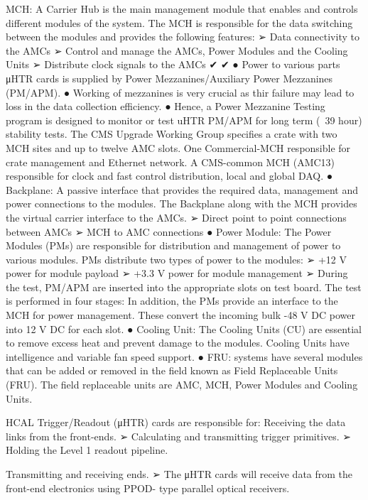 MCH:
A \mtca Carrier Hub is the main management module that enables and
controls different modules of the \mtca system. The MCH is responsible for the data
switching between the modules and provides the following features:
➢ Data connectivity to the AMCs
➢ Control and manage the AMCs, Power Modules and the Cooling Units
➢ Distribute clock signals to the AMCs
✔
✔
● Power
to various parts μHTR cards is supplied by Power
Mezzanines/Auxiliary Power Mezzanines (PM/APM).
● Working of mezzanines is very crucial as thir failure may lead to loss in
the data collection efficiency.
● Hence, a Power Mezzanine Testing program is designed to monitor or test
uHTR PM/APM for long term (~39 hour) stability tests.
The CMS Upgrade Working Group specifies a \mtca crate with two MCH sites and
up to twelve AMC slots.
One Commercial-MCH responsible for crate management and Ethernet
network.
A CMS-common MCH (AMC13) responsible for clock and fast control
distribution, local and global DAQ.
● Backplane:
A passive interface that provides the required data, management and
power connections to the \mtca modules. The Backplane along with the MCH
provides the virtual carrier interface to the AMCs.
➢ Direct point to point connections between AMCs
➢ MCH to AMC connections
● Power
Module: The Power Modules (PMs) are responsible for distribution and
management of power to various \mtca modules. PMs distribute two types of power
to the \mtca modules:
➢ +12 V power for module payload
➢ +3.3 V power for module management
➢ During
the test, PM/APM are inserted into the appropriate slots on test
board. The test is performed in four stages:
In addition, the PMs provide an interface to the MCH for power management. These
convert the incoming bulk -48 V DC power into 12 V DC for each slot.
● Cooling
Unit: The Cooling Units (CU) are essential to remove excess heat and
prevent damage to the modules. Cooling Units have intelligence and variable fan
speed support.
● FRU:
\mtca systems have several modules that can be added or removed in the
field known as Field Replaceable Units (FRU). The field replaceable units are AMC,
MCH, Power Modules and Cooling Units.


HCAL Trigger/Readout (μHTR) cards are responsible for:
Receiving the data links from the front-ends.
➢ Calculating and transmitting trigger primitives.
➢ Holding the Level 1 readout pipeline.


Transmitting and receiving ends.
➢ The μHTR cards will receive
data from the front-end electronics using PPOD-
type parallel optical receivers.


